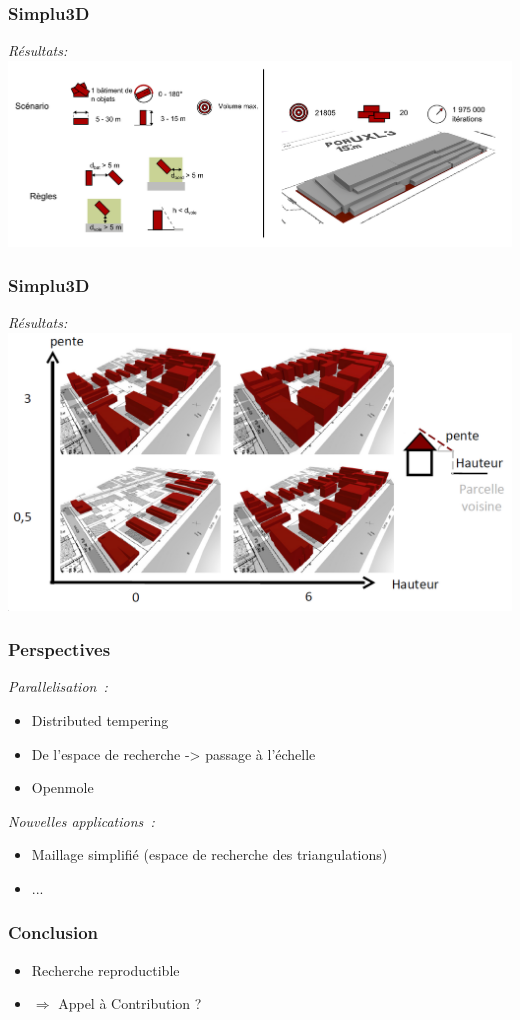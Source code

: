 \documentclass{beamer}
\begin{document}
\begin{frame}
\frametitle{Simplu3D}
\emph{R\'esultats:}
 \includegraphics[width=\textwidth]{simplu3D1.png}
\end{frame}

\begin{frame}
\frametitle{Simplu3D}
\emph{R\'esultats:}
 \includegraphics[width=\textwidth]{simplu3D2.png}
\end{frame}

\begin{frame}
\frametitle{Perspectives}
\emph{Parallelisation~:} 
\begin{itemize}
\item Distributed tempering
\item De l'espace de recherche -> passage à l'échelle
\item Openmole
\end{itemize}

\emph{Nouvelles applications~:} 
\begin{itemize}
\item Maillage simplifié (espace de recherche des triangulations)
\item ...
\end{itemize}
\end{frame}

\begin{frame}
\frametitle{Conclusion}
\begin{itemize}
\item Recherche reproductible
\item $\Rightarrow$ Appel à Contribution ?
\end{itemize}

\end{frame}
\end{document}
